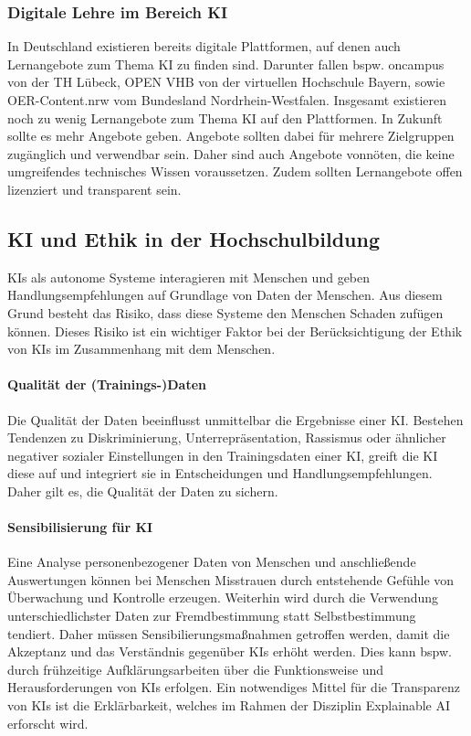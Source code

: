 \subsubsection*{Digitale Lehre im Bereich KI}
In Deutschland existieren bereits digitale Plattformen, auf denen auch Lernangebote zum Thema \ac{KI} zu finden sind.
Darunter fallen bspw. oncampus von der TH Lübeck, OPEN VHB von der virtuellen Hochschule Bayern, sowie OER-Content.nrw vom Bundesland Nordrhein-Westfalen.
Insgesamt existieren noch zu wenig Lernangebote zum Thema \ac{KI} auf den Plattformen. In Zukunft sollte es mehr Angebote geben.
Angebote sollten dabei für mehrere Zielgruppen zugänglich und verwendbar sein. Daher sind auch Angebote vonnöten, die keine umgreifendes technisches Wissen voraussetzen.
Zudem sollten Lernangebote offen lizenziert und transparent sein. \cite*[S. 28ff.]{Witt.2020}

\subsection{KI und Ethik in der Hochschulbildung}
KIs als autonome Systeme interagieren mit Menschen und geben Handlungsempfehlungen auf Grundlage von Daten der Menschen.
Aus diesem Grund besteht das Risiko, dass diese Systeme den Menschen Schaden zufügen können.
Dieses Risiko ist ein wichtiger Faktor bei der Berücksichtigung der Ethik von KIs im Zusammenhang mit dem Menschen. \cite*[S. 38]{Witt.2020}

\paragraph*{Qualität der (Trainings-)Daten}
Die Qualität der Daten beeinflusst unmittelbar die Ergebnisse einer \ac{KI}.
Bestehen Tendenzen zu Diskriminierung, Unterrepräsentation, Rassismus oder ähnlicher negativer sozialer Einstellungen in den Trainingsdaten einer \ac{KI}, greift die \ac{KI} diese auf und integriert sie in Entscheidungen und Handlungsempfehlungen.
Daher gilt es, die Qualität der Daten zu sichern. \cite*[S. 39]{Witt.2020}

\paragraph*{Sensibilisierung für KI}
Eine Analyse personenbezogener Daten von Menschen und anschließende Auswertungen können bei Menschen Misstrauen durch entstehende Gefühle von Überwachung und Kontrolle erzeugen.
Weiterhin wird durch die Verwendung unterschiedlichster Daten zur Fremdbestimmung statt Selbstbestimmung tendiert.
Daher müssen Sensibilierungsmaßnahmen getroffen werden, damit die Akzeptanz und das Verständnis gegenüber KIs erhöht werden.
Dies kann  bspw. durch frühzeitige Aufklärungsarbeiten über die Funktionsweise und Herausforderungen von KIs erfolgen.
Ein notwendiges Mittel für die Transparenz von KIs ist die Erklärbarkeit, welches im Rahmen der Disziplin Explainable AI erforscht wird. \cite*[S. 39ff.]{Witt.2020}
